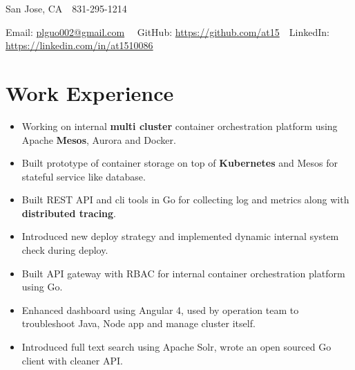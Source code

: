 \documentclass[11pt, letterpaper]{simple-cv}
\begin{document}
\centerline{
	San Jose, CA\ \
	831-295-1214\ \
}
\centerline{
	Email: \href{plguo002@gmail.com}{plguo002@gmail.com}\ \
	GitHub: \href{https://github.com/at15}{https://github.com/at15}\ \
	LinkedIn: \href{https://www.linkedin.com/in/at1510086}{https://linkedin.com/in/at1510086}}

\section{Work Experience}

\begin{itemize}
	\item Working on internal \textbf{multi cluster} container orchestration platform using Apache \textbf{Mesos}, Aurora and Docker.
	\item Built prototype of container storage on top of \textbf{Kubernetes} and Mesos for stateful service like database.
	\item Built REST API and cli tools in Go for collecting log and metrics along with \textbf{distributed tracing}.
	\item Introduced new deploy strategy and implemented dynamic internal system check during deploy.
\end{itemize}

\begin{itemize}
	\item Built API gateway with RBAC for internal container orchestration platform using Go.
	\item Enhanced dashboard using Angular 4, used by operation team to troubleshoot Java, Node app and manage cluster itself.
	\item Introduced full text search using Apache Solr, wrote an open sourced Go client with cleaner API. %
\end{itemize}
\end{document}
